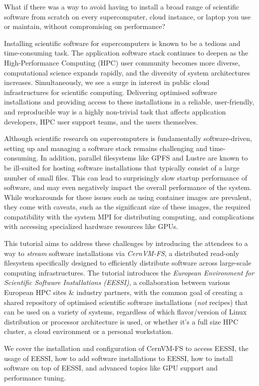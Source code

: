 What if there was a way to avoid having to install a broad range of scientific software from scratch on every
supercomputer, cloud instance, or laptop you use or maintain, without compromising on performance?

Installing scientific software for supercomputers is known to be a tedious and time-consuming task. The application
software stack continues to deepen as the
High-Performance Computing (HPC) user community becomes more diverse, computational science expands rapidly, and the diversity of system architectures
increases. Simultaneously, we see a surge in interest in public cloud
infrastructures for scientific computing. Delivering optimised software installations and providing access to these
installations in a reliable, user-friendly, and reproducible way is a highly non-trivial task that affects application
developers, HPC user support teams, and the users themselves.

Although scientific research on supercomputers is fundamentally software-driven,
setting up and managing a software stack remains challenging and time-consuming.
In addition, parallel filesystems like GPFS and Lustre are known to be ill-suited for hosting software installations
that typically consist of a large number of small files. This can lead to surprisingly slow startup performance of
software, and may even negatively impact the overall performance of the system.
While workarounds for these issues such as using container images are prevalent, they come with caveats,
such as the significant size of these images, the required compatibility with the system MPI for distributing computing,
and complications with accessing specialized hardware resources like GPUs.

This tutorial aims to address these challenges by introducing the attendees to a way to \emph{stream}
software installations via \emph{CernVM-FS}, a distributed read-only filesystem specifically designed
to efficiently distribute software across large-scale computing infrastructures.
The tutorial introduces the \emph{European Environment for Scientific Software Installations (EESSI)},
a collaboration between various European HPC sites \& industry partners, with the common goal of
creating a shared repository of optimised scientific software installations (\emph{not} recipes) that can be used on a variety of
systems, regardless of which flavor/version of Linux distribution or processor architecture is used, or whether it's a full size HPC
cluster, a cloud environment or a personal workstation.

We cover the installation and configuration of CernVM-FS to access EESSI, the usage of EESSI, how to add software
installations to EESSI, how to install software on top of EESSI, and advanced topics like GPU support and performance
tuning.
